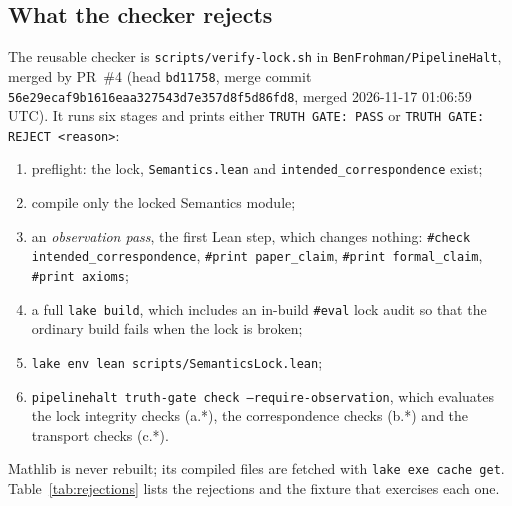 \documentclass[11pt,a4paper]{article}
\newcommand{\code}[1]{\texttt{#1}}
\begin{document}
\subsection{What the checker rejects}

The reusable checker is \code{scripts/verify-lock.sh} in \code{BenFrohman/PipelineHalt},
merged by PR~\#4 (head \code{bd11758}, merge commit
\code{56e29ecaf9b1616eaa327543d7e357d8f5d86fd8}, merged 2026-11-17 01:06:59 UTC). It runs six
stages and prints either \code{TRUTH GATE: PASS} or \code{TRUTH GATE: REJECT <reason>}:
\begin{enumerate}[start=0]
\item preflight: the lock, \code{Semantics.lean} and \code{intended\_correspondence} exist;
\item compile only the locked Semantics module;
\item an \emph{observation pass}, the first Lean step, which changes nothing:
  \code{\#check intended\_correspondence}, \code{\#print paper\_claim},
  \code{\#print formal\_claim}, \code{\#print axioms};
\item a full \code{lake build}, which includes an in-build \code{\#eval} lock audit so that the
  ordinary build fails when the lock is broken;
\item \code{lake env lean scripts/SemanticsLock.lean};
\item \code{pipelinehalt truth-gate check --require-observation}, which evaluates the lock
  integrity checks (a.*), the correspondence checks (b.*) and the transport checks (c.*).
\end{enumerate}
Mathlib is never rebuilt; its compiled files are fetched with \code{lake exe cache get}.
Table~\ref{tab:rejections} lists the rejections and the fixture that exercises each one.
\end{document}
